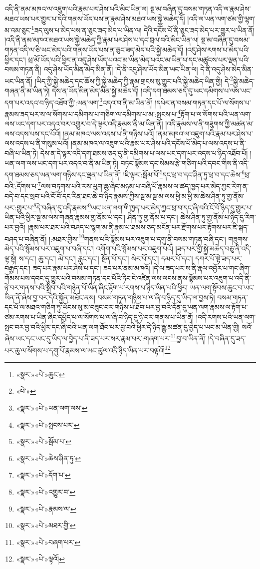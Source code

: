 འདི་ནི་ནམ་མཁའ་ལ་འཇུག་པའི་རྣམ་པར་ཤེས་པའི་མིང་ཡིན་ལ། སྔ་མ་བཞིན་དུ་བསམ་གཏན་འདི་ལ་རྣམ་ཤེས་མཐའ་ཡས་པར་གྱུར་པ་དེའི་གནས་ཡོད་པས་ན་རྣམ་ཤེས་མཐའ་ཡས་སྐྱེ་མཆེད་དོ། །འདི་ལ་ཡན་ལག་ཙམ་གྱི་ལྷག་མ་འམ་ཅུང་\footnote{«སྣར་»«པེ་»ཆུང་}ཟད་ལུས་པ་མེད་པས་ན་ཅུང་ཟད་མེད་པ་ཡིན་ལ། དེའི་དངོས་པོ་ནི་ཅུང་ཟད་མེད་པར་གྱུར་པ་ཡིན་ནོ། །འདི་ནི་ནམ་མཁའ་མཐའ་ཡས་སྐྱེ་མཆེད་ཀྱི་རྣམ་པར་ཤེས་པ་དང་བྲལ་བའི་མིང་ཡིན་ལ། སྔ་མ་བཞིན་དུ་བསམ་གཏན་འདི་ལ་ཅི་ཡང་མེད་པའི་གནས་ཡོད་པས་ན་ཅུང་ཟད་མེད་པའི་སྐྱེ་མཆེད་དོ། །འདུ་ཤེས་རགས་པ་མེད་པའི་ཕྱིར་དང་། ཕྲ་མོ་ཡོད་པའི་ཕྱིར་ན་འདུ་ཤེས་ཡོད་པའང་མ་ཡིན་མེད་པའང་མ་ཡིན་པ་དང་མཚུངས་པར་ལྡན་པའི་བསམ་གཏན་ནི། འདུ་ཤེས་ཡོད་མིན་མེད་མིན་ནོ། །དེ་ནི་འདུ་ཤེས་ཡོད་མིན་ཡང་ཡིན་ལ། དེ་ནི་འདུ་ཤེས་མེད་མིན་ཡང་ཡིན་ནོ། །ཡིད་ཀྱི་སྐྱེ་མཆེད་དང་ཆོས་ཀྱི་སྐྱེ་མཆེད་ཀྱི་རྣམ་གྲངས་སུ་གྱུར་པའི་སྐྱེ་མཆེད་ཡིན་གྱི། དེ་\footnote{«པེ་»}སྐྱེ་མཆེད་གཞན་ནི་མ་ཡིན་ཏེ། དེས་ན་ཡོད་མིན་མེད་མིན་སྐྱེ་མཆེད་དོ། །འདི་དག་ཐམས་ཅད་དུ་ཡང་དམིགས་པ་ལས་ཡང་དག་པར་འདའ་བ་ཉིད་འཐོབ་ཀྱི་:ཡན་ལག་\footnote{«སྣར་»«པེ་»ཡན་ལག་ལས་}འདའ་བ་ནི་མ་ཡིན་ནོ། །དཔེར་ན་བསམ་གཏན་དང་པོ་ལ་སོགས་པ་རྣམས་ཟད་པར་ས་ལ་སོགས་པ་དམིགས་པ་གཅིག་ལ་དམིགས་པ་མ་:སྤངས་པ་\footnote{«སྣར་»«པེ་»སྤངས་པར་}རྟོག་པ་ལ་སོགས་པའི་ཡན་ལག་ལས་ཡང་དག་པར་འདའ་བར་འགྱུར་བ་དེ་ལྟར་འདི་རྣམས་ནི་མ་ཡིན་ནོ། །འདི་རྣམས་ལ་ནི་གཟུགས་ཀྱི་མཚན་མ་ལས་འདས་པས་དང་པོའོ། །ནམ་མཁའ་ལས་འདས་པ་ནི་གཉིས་པའོ། །ནམ་མཁའ་ལ་འཇུག་པའི་རྣམ་པར་ཤེས་པ་ལས་འདས་པ་ནི་གསུམ་པའོ། །ནམ་མཁའ་ལ་འཇུག་པའི་རྣམ་པར་ཤེས་པའི་དངོས་པོ་མེད་པ་ལས་འདས་པ་ནི་བཞི་པ་ཡིན་ཏེ། དེས་ན་དེ་ལྟར་འདི་དག་ཐམས་ཅད་དུ་ནི་དམིགས་པ་ལས་ཡང་དག་པར་འདས་པ་ཉིད་འཐོབ་པོ། །ཡན་ལག་ལས་ཡང་དག་པར་འདའ་བ་ནི་མ་ཡིན་ཏེ། བཏང་སྙོམས་དང་སེམས་རྩེ་གཅིག་པའི་དབང་གིས་ནི་འདི་དག་ཐམས་ཅད་ཡན་ལག་གཉིས་དང་ལྡན་པ་ཡིན་ནོ། །ཇི་ལྟར་:སྦོམ་པོ་\footnote{«སྣར་»«པེ་»སྦོམ་པ་}དང་ཕྲ་བ་དང་ཤིན་ཏུ་ཕྲ་བ་དང་ཆེས་\footnote{«སྣར་»«པེ་»ཆེས་ཤིན་ཏུ་}ཕྲ་བའི་:དོགས་པ་\footnote{«སྣར་»«པེ་»དོག་པ་}ལས་བཏགས་པའི་རས་ཡུག་ཆུ་ཞེང་མཉམ་པ་བཞི་པོ་རྣམས་ལ་ཚད་ཁྱད་པར་མེད་ཀྱང་རེག་ན་བདེ་བ་དང་སྲབ་པའི་ངོ་བོ་དང་རིན་ཐང་ཆེ་བ་ཉིད་རྣམས་ཀྱིས་སྔ་མ་སྔ་མ་ལས་ཕྱི་མ་ཕྱི་མ་ཆེས་ཤིན་ཏུ་གྱ་ནོམ་པར་:གྱུར་པ་\footnote{«སྣར་»«པེ་»འགྱུར་བ་}དེ་བཞིན་དུ་འདི་རྣམས་\footnote{«སྣར་»«པེ་»རྣམས་ལ་}ཡང་ཡན་ལག་གི་ཁྱད་པར་མེད་ཀྱང་ཕྲ་བ་དང་ཞི་བའི་ངོ་བོ་ཉིད་དུ་གྱུར་པ་ཡིན་པའི་ཕྱིར་སྔ་མ་ལས་གཞན་རྣམས་གྱ་ནོམ་པ་དང་། ཤིན་ཏུ་གྱ་ནོམ་པ་དང་། ཆེས་ཤིན་ཏུ་གྱ་ནོམ་པ་ཉིད་དུ་རིག་པར་བྱའོ། །རྣམ་པར་ཐར་པའི་བཤད་པ་ལྷག་མ་ནི་རྣམ་པ་ཐམས་ཅད་མངོན་པར་རྫོགས་པར་རྟོགས་པར་ཇི་སྐད་བཤད་པ་བཞིན་ནོ། །:མཐར་གྱིས་\footnote{«སྣར་»«པེ་»མཐར་གྱི་}གནས་པའི་སྙོམས་པར་འཇུག་པ་དགུ་ནི་བསམ་གཏན་བཞི་དང་། གཟུགས་མེད་པའི་སྙོམས་པར་འཇུག་པ་བཞི་དང་། འགོག་པའི་སྙོམས་པར་འཇུག་པའོ། །ཟད་པར་གྱི་སྐྱེ་མཆེད་བཅུ་ནི་འདི་ལྟ་སྟེ། ས་དང་། ཆུ་དང་། མེ་དང་། རླུང་དང་། སྔོན་པོ་དང་། སེར་པོ་དང་། དམར་པོ་དང་། དཀར་པོ་སྟེ་ཟད་པར་བརྒྱད་དང་། ཟད་པར་རྣམ་པར་ཤེས་པ་དང་། ཟད་པར་ནམ་མཁའོ། །དེ་ལ་ཟད་པར་ས་ནི་རྣལ་འབྱོར་པ་གང་ཞིག་གོམས་པས་དབང་དུ་གྱུར་པའི་བསམ་གཏན་དང་པོའི་ཏིང་ངེ་འཛིན་ལས་ལངས་ནས་སྙོམས་པར་འཇུག་པ་འདི་ནི་ཉེ་བར་གནས་པའི་སྒྲིབ་པའི་གཉེན་པོ་ཡིན་ཞིང་རྟོག་པ་རགས་པ་ཉིད་ཡིན་པའི་ཕྱིར། ཡན་ལག་སྟོབས་ཆུང་བ་ཡང་ཡིན་ནོ་ཞེས་བྱ་བར་དེའི་སྐྱོན་མཐོང་ནས། བསམ་གཏན་གཉིས་པ་ལ་ཞི་བ་ཉིད་དུ་ཡིད་ལ་བྱས་ཏེ། བསམ་གཏན་དང་པོ་ལ་མཐའ་གཅིག་ཏུ་ཡོངས་སུ་མ་བཟུང་བར་གཉིས་པ་ཐོབ་པར་བྱ་བའི་དོན་དུ་ཡན་ལག་རྣམས་ལ་རྟོག་པ་ཙམ་རགས་པ་ཡིན་ཞིང་དཔྱོད་པ་ལ་སོགས་པ་ལ་ཞི་བ་ཉིད་དུ་ཉེ་བར་གནས་པ་ཡིན་ནོ། །འདི་རགས་པའི་ཡན་ལག་སྤང་བར་བྱ་བའི་ཕྱིར་དང་ཞི་བའི་ཡན་ལག་ཐོབ་པར་བྱ་བའི་ཕྱིར་དེ་ཉིད་རྒྱུ་མཚན་དུ་བྱེད་པ་ཡང་མ་ཡིན་གྱི། སའོ་ཞེས་ཡང་དང་ཡང་དུ་ཡིད་ལ་བྱེད་པ་ནི་ཟད་པར་སར་རྣམ་པར་:གཞག་པར་\footnote{«སྣར་»«པེ་»བཞག་པར་}བྱ་བ་ཡིན་ནོ། །དེ་བཞིན་དུ་ཟད་པར་ཆུ་ལ་སོགས་པ་དགུ་པོ་རྣམས་ལ་ཡང་ཚུལ་འདི་ཉིད་ཡིན་པར་བལྟའོ།\footnote{«སྣར་»«པེ་»ལྟའོ།} 